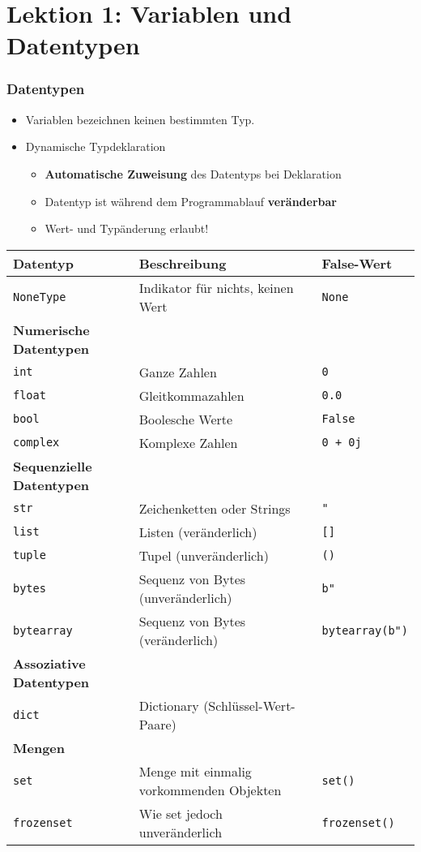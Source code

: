 \part{Lektion 1: Variablen und Datentypen}
\section{Datentypen}
\begin{itemize}
	\item Variablen bezeichnen keinen bestimmten Typ.
	\item Dynamische Typdeklaration
	\begin{itemize}
		\item \textbf{Automatische Zuweisung} des Datentyps bei Deklaration
		\item Datentyp ist während dem Programmablauf \textbf{veränderbar}
		\item Wert- und Typänderung erlaubt!
	\end{itemize}
\end{itemize}
\begin{tabular}{|l|l|l|}
	\hline 
	\textbf{Datentyp} &\textbf{Beschreibung} &\textbf{False-Wert}\\
	\hline
	\texttt{NoneType} &Indikator für nichts, keinen Wert &\texttt{None}\\ 
	\hline
	\textbf{Numerische Datentypen}&&\\
	\texttt{int} &Ganze Zahlen &\texttt{0}\\ 
	\texttt{float} &Gleitkommazahlen &\texttt{0.0}\\ 
	\texttt{bool} &Boolesche Werte &\texttt{False}\\ 
	\texttt{complex} &Komplexe Zahlen &\texttt{0 + 0j}\\ 
	\hline 
	\textbf{Sequenzielle Datentypen}&&\\
	\texttt{str} &Zeichenketten oder Strings &\texttt{"}\\
	\texttt{list} &Listen (veränderlich) &\texttt{[]}\\
	\texttt{tuple} &Tupel (unveränderlich) &\texttt{()}\\
	\texttt{bytes} &Sequenz von Bytes (unveränderlich) &\texttt{b"}\\
	\texttt{bytearray} &Sequenz von Bytes (veränderlich) &\texttt{bytearray(b")}\\
	\hline
	\textbf{Assoziative Datentypen}&&\\
	\texttt{dict} &Dictionary (Schlüssel-Wert-Paare) &\texttt{{}}\\
	\hline
	\textbf{Mengen}&&\\
	\texttt{set} &Menge mit einmalig vorkommenden Objekten &\texttt{set()}\\
	\texttt{frozenset} &Wie set jedoch unveränderlich &\texttt{frozenset()}\\
	\hline
\end{tabular}\\
